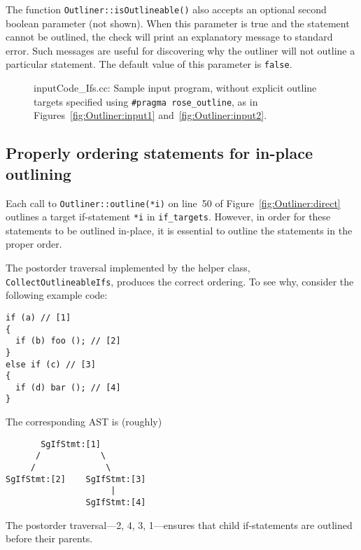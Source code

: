 The function \texttt{Outliner::isOutlineable()} also accepts an
optional second boolean parameter (not shown). When this parameter is
true and the statement cannot be outlined, the check will print an
explanatory message to standard error. Such messages are useful for
discovering why the outliner will not outline a particular
statement. The default value of this parameter is \texttt{false}.

\begin{figure}[!h]
{\indent
{\mySmallFontSize
\begin{latexonly}
   
\end{latexonly}
\begin{htmlonly}
   
\end{htmlonly}

}
}
\caption{inputCode\_Ifs.cc: Sample input program, without explicit
outline targets specified using \texttt{\#pragma rose\_outline}, as in
Figures~\ref{fig:Outliner:input1}
and~\ref{fig:Outliner:input2}.}
\label{fig:Outliner:input3}
\end{figure}

\subsection{Properly ordering statements for in-place outlining}
\label{sec:Outliner:direct:ordering}

Each call to \texttt{Outliner::outline(*i)} on line~50 of
Figure~\ref{fig:Outliner:direct} outlines a target if-statement
\texttt{*i} in \texttt{if\_targets}. However, in order for these
statements to be outlined in-place, it is essential to outline the
statements in the proper order.

The postorder traversal implemented by the helper class,
\texttt{CollectOutlineableIfs}, produces the correct ordering.  To see
why, consider the following example code:
%
\begin{lstlisting}
if (a) // [1]
{
  if (b) foo (); // [2]
}
else if (c) // [3]
{
  if (d) bar (); // [4]
}
\end{lstlisting}
%
The corresponding AST is (roughly)
\begin{verbatim}
       SgIfStmt:[1]
      /            \
     /              \
SgIfStmt:[2]    SgIfStmt:[3]
                     | 
                SgIfStmt:[4]
\end{verbatim}
%
The postorder traversal---2, 4, 3, 1---ensures that child
if-statements are outlined before their parents.

